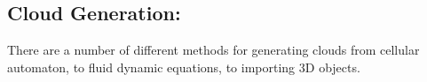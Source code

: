\subsection{Cloud Generation:}
There are a number of different methods for generating clouds from cellular automaton, to fluid dynamic equations, to importing 3D objects.



